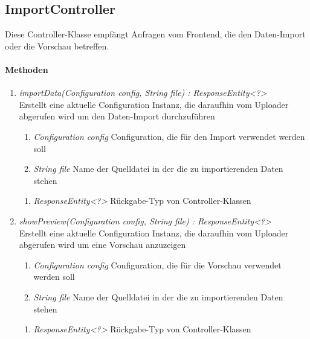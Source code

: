 \subsection{ImportController}
Diese Controller-Klasse empfängt Anfragen vom Frontend, die den Daten-Import oder die Vorschau betreffen.

\paragraph{Methoden}

\begin{enumerate}[+]
	\item \textit{ importData(Configuration config, String file) : ResponseEntity<?>}\\
	Erstellt eine aktuelle Configuration Instanz, die daraufhin vom Uploader abgerufen wird um den Daten-Import durchzuführen
	
	\begin{enumerate}[$\bullet$]
		\item \textit{Configuration config} Configuration, die für den Import verwendet werden soll
		\item \textit{String file} Name der Quelldatei in der die zu importierenden Daten stehen
	\end{enumerate}
	\vspace{-0.2cm}
	\begin{enumerate}[$\circ$]
		\item \textit{ResponseEntity<?>} Rückgabe-Typ von Controller-Klassen
	\end{enumerate}
	
	\item \textit{ showPreview(Configuration config, String file) : ResponseEntity<?>}\\
	Erstellt eine aktuelle Configuration Instanz, die daraufhin vom Uploader abgerufen wird um eine Vorschau anzuzeigen
	
	\begin{enumerate}[$\bullet$]
		\item \textit{Configuration config} Configuration, die für die Vorschau verwendet werden soll
		\item \textit{String file} Name der Quelldatei in der die zu importierenden Daten stehen
	\end{enumerate}
	\vspace{-0.2cm}
	\begin{enumerate}[$\circ$]
		\item \textit{ResponseEntity<?>} Rückgabe-Typ von Controller-Klassen
	\end{enumerate}
\end{enumerate}